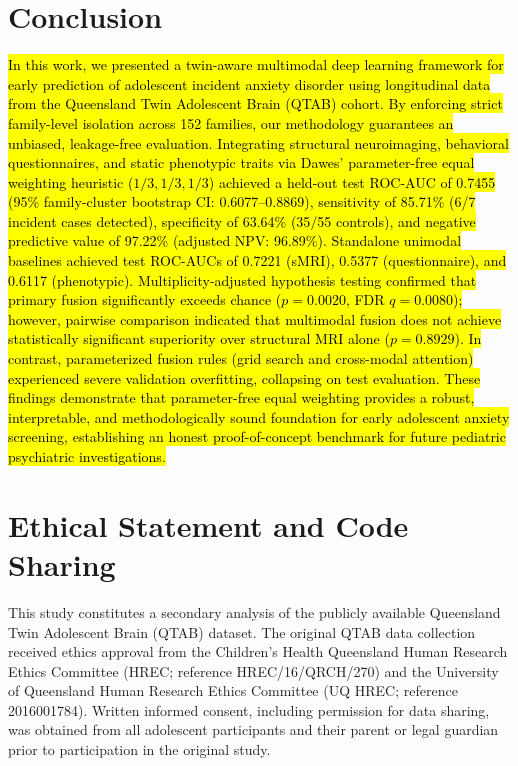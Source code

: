 \documentclass[10pt,letterpaper]{article}
\begin{document}
\section*{Conclusion}

\hl{In this work, we presented a twin-aware multimodal deep learning framework for early prediction of adolescent incident anxiety disorder using longitudinal data from the Queensland Twin Adolescent Brain (QTAB) cohort. By enforcing strict family-level isolation across 152 families, our methodology guarantees an unbiased, leakage-free evaluation. Integrating structural neuroimaging, behavioral questionnaires, and static phenotypic traits via Dawes' parameter-free equal weighting heuristic ($1/3, 1/3, 1/3$) achieved a held-out test ROC-AUC of 0.7455 (95\% family-cluster bootstrap CI: 0.6077--0.8869), sensitivity of 85.71\% (6/7 incident cases detected), specificity of 63.64\% (35/55 controls), and negative predictive value of 97.22\% (adjusted NPV: 96.89\%). Standalone unimodal baselines achieved test ROC-AUCs of 0.7221 (sMRI), 0.5377 (questionnaire), and 0.6117 (phenotypic). Multiplicity-adjusted hypothesis testing confirmed that primary fusion significantly exceeds chance ($p = 0.0020$, FDR $q = 0.0080$); however, pairwise comparison indicated that multimodal fusion does not achieve statistically significant superiority over structural MRI alone ($p = 0.8929$). In contrast, parameterized fusion rules (grid search and cross-modal attention) experienced severe validation overfitting, collapsing on test evaluation. These findings demonstrate that parameter-free equal weighting provides a robust, interpretable, and methodologically sound foundation for early adolescent anxiety screening, establishing an honest proof-of-concept benchmark for future pediatric psychiatric investigations.}

\section*{Ethical Statement and Code Sharing}

This study constitutes a secondary analysis of the publicly available Queensland Twin Adolescent Brain (QTAB) dataset. The original QTAB data collection received ethics approval from the Children's Health Queensland Human Research Ethics Committee (HREC; reference HREC/16/QRCH/270) and the University of Queensland Human Research Ethics Committee (UQ HREC; reference 2016001784). Written informed consent, including permission for data sharing, was obtained from all adolescent participants and their parent or legal guardian prior to participation in the original study.
\end{document}
